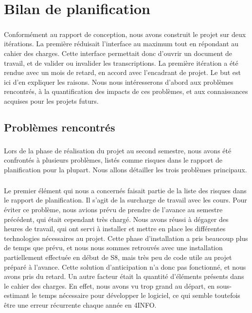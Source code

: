 \chapter{Bilan de planification}

\paragraph{}
Conformément au rapport de conception, nous avons construit le projet sur deux itérations. La première réduisait l'interface au maximum tout en répondant au cahier des charges. Cette interface permettait donc d'ouvrir un document de travail, et de valider ou invalider les transcriptions. La première itération a été rendue avec un mois de retard, en accord avec l'encadrant de projet. Le but est ici d'en expliquer les raisons. Nous nous intéresserons d'abord aux problèmes rencontrés, à la quantification des impacts de ces problèmes, et aux connaissances acquises pour les projets futurs.

\section{Problèmes rencontrés}

\paragraph{}
Lors de la phase de réalisation du projet au second semestre, nous avons été confrontés à plusieurs problèmes, listés comme risques dans le rapport de planification pour la plupart. Nous allons détailler les trois problèmes principaux.

\paragraph{}
Le premier élément qui nous a concernés faisait partie de la liste des risques dans le rapport de planification. Il s'agit de la surcharge de travail avec les cours. Pour éviter ce problème, nous avions prévu de prendre de l'avance au semestre précédent, qui était cependant très chargé. Nous avons réussi à dégager des heures de travail, qui ont servi à installer et mettre en place les différentes technologies nécessaires au projet. Cette phase d'installation a pris beaucoup plus de temps que prévu, et nous nous sommes retrouvés avec une installation partiellement effectuée en début de S8, mais très peu de code utile au projet préparé à l'avance. Cette solution d'anticipation n'a donc pas fonctionné, et nous avons pris du retard. Un autre facteur était la quantité d'éléments présents dans le cahier des charges. En effet, nous avons vu trop grand au départ, en sous-estimant le temps nécessaire pour développer le logiciel, ce qui semble toutefois être une erreur récurrente chaque année en 4INFO.

